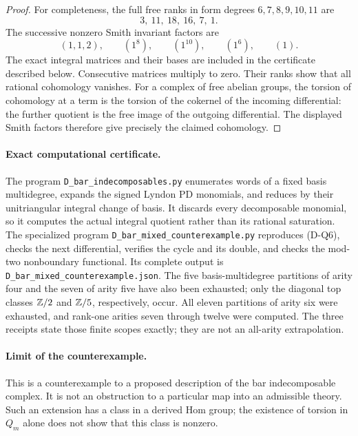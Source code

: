 \begin{proof}
For completeness, the full free ranks in form degrees
$6,7,8,9,10,11$ are
\[
 3,\ 11,\ 18,\ 16,\ 7,\ 1.
\]
The successive nonzero Smith invariant factors are
\[
 (1,1,2),\qquad (1^8),\qquad (1^{10}),\qquad
 (1^6),\qquad (1).
\]
The exact integral matrices and their bases are included in
the certificate described below. Consecutive matrices multiply
to zero. Their ranks show that all rational cohomology vanishes.
For a complex of free abelian groups, the torsion of cohomology
at a term is the torsion of the cokernel of the incoming
differential: the further quotient is the free image of the
outgoing differential. The displayed Smith factors therefore
give precisely the claimed cohomology.
\end{proof}

\paragraph{Exact computational certificate.}
The program \texttt{D\_bar\_indecomposables.py} enumerates words
of a fixed basis multidegree, expands the signed Lyndon
PD monomials, and reduces by their unitriangular integral
change of basis. It discards every decomposable monomial,
so it computes the actual integral quotient rather than its
rational saturation. The specialized program
\texttt{D\_bar\_mixed\_counterexample.py} reproduces
\textup{(D-Q6)}, checks the next differential, verifies the
cycle and its double, and checks the mod-two nonboundary
functional. Its complete output is
\texttt{D\_bar\_mixed\_counterexample.json}.
The five basis-multidegree partitions of arity four and the
seven of arity five have also been exhausted; only the
diagonal top classes $\mathbb Z/2$ and $\mathbb Z/5$, respectively, occur.
All eleven partitions of arity six were exhausted, and
rank-one arities seven through twelve were computed.
The three receipts state those finite scopes exactly;
they are not an all-arity extrapolation.

\paragraph{Limit of the counterexample.}
This is a counterexample to a proposed description of the
bar indecomposable complex. It is not an obstruction to a
particular map into an admissible theory. Such an extension
has a class in a derived Hom group; the existence of torsion
in $Q_m$ alone does not show that this class is nonzero.

